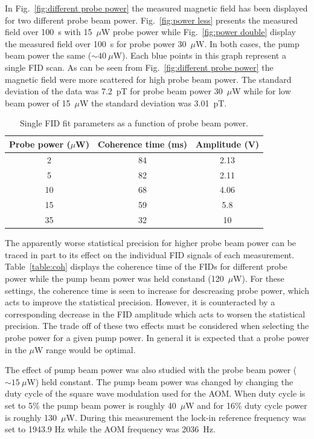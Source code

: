 In Fig.~\ref{fig:different probe power} the measured magnetic field
has been displayed for two different probe beam
power. Fig.~\ref{fig:power less} presents the measured field over
100~s with 15~$\mu$W probe power while Fig.~\ref{fig:power double}
display the measured field over 100~s for probe power 30~$\mu$W. In
both cases, the pump beam power the same ($\sim 40~\mu$W). Each blue
points in this graph represent a single FID scan. As can be seen from
Fig.~\ref{fig:different probe power} the magnetic field were more
scattered for high probe beam power.  The standard deviation of the
data was 7.2~pT for probe beam power 30~$\mu$W while for low beam
power of 15~$\mu$W the standard deviation was 3.01~pT.

\begin{table}%
\centering
\begin{tabular}{|c|c|c|}\hline
\textbf{Probe power ($\mu$W)}    & \textbf{Coherence time (ms)}  & \textbf{Amplitude (V)}\\\hline
2 & 84 & 2.13   \\
5    & 82 & 2.11  \\
10   &  68 & 4.06 \\
15  &   59 & 5.8  \\
35  &   32 & 10  \\\hline
\end{tabular}
\caption{Single FID fit parameters as a function of probe beam
  power.\label{tab:coh}}
\end{table}

The apparently worse statistical precision for higher probe beam power
can be traced in part to its effect on the individual FID signals of
each measurement.  Table~\ref{table:coh} displays the coherence time
of the FIDs for different probe power while the pump beam power was
held constand (120~$\mu$W).  For these settings, the coherence time is
seen to increase for descreasing probe power, which acts to improve
the statistical precision.  However, it is counteracted by a
corresponding decrease in the FID amplitude which acts to worsen the
statistical precision.  The trade off of these two effects must be
considered when selecting the probe power for a given pump power.  In
general it is expected that a probe power in the $\mu$W range would be
optimal.
 
The effect of pump beam power was also studied with the probe beam
power ($\sim 15~\mu$W) held constant.  The pump beam power was changed
by changing the duty cycle of the square wave modulation used for the
AOM.  When duty cycle is set to 5\% the pump beam power is roughly
40~$\mu$W and for 16\% duty cycle power is roughly 130~$\mu$W. During
this measurement the lock-in reference frequency was set to 1943.9 Hz
while the AOM frequency was 2036~Hz.

